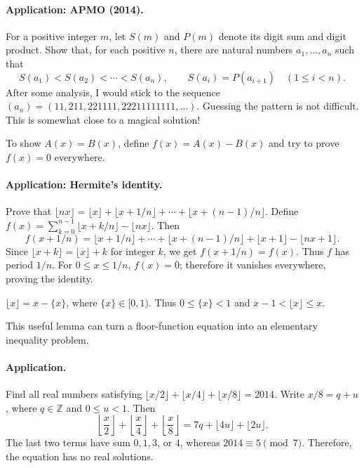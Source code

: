 \documentclass[11pt,a4paper]{article}
\begin{document}
\paragraph{Application: APMO (2014).}
For a positive integer $m$, let $S(m)$ and $P(m)$ denote its digit sum and digit product.
Show that, for each positive $n$, there are natural numbers $a_1,\ldots,a_n$ such that
\[
S(a_1)<S(a_2)<\cdots<S(a_n),\qquad S(a_i)=P(a_{i+1})\quad(1\leq i<n).
\]
After some analysis, I would stick to the sequence
$(a_n)=(11,\allowbreak211,\allowbreak221111,\allowbreak22211111111,\allowbreak\ldots)$.
Guessing the pattern is not difficult. This is somewhat close to a magical solution!

\setcounter{theorem}{55}\begin{lemma}
To show $A(x)=B(x)$, define $f(x)=A(x)-B(x)$ and try to prove $f(x)=0$ everywhere.
\end{lemma}
\paragraph{Application: Hermite's identity.}
Prove that
$\lfloor nx\rfloor=\lfloor x\rfloor+\lfloor x+1/n\rfloor+\cdots+\lfloor x+(n-1)/n\rfloor$.
Define $f(x)=\sum_{k=0}^{n-1}\lfloor x+k/n\rfloor-\lfloor nx\rfloor$.
Then
\[
f(x+1/n)=\lfloor x+1/n\rfloor+\cdots+\lfloor x+(n-1)/n\rfloor
+\lfloor x+1\rfloor-\lfloor nx+1\rfloor.
\]
Since $\lfloor x+k\rfloor=\lfloor x\rfloor+k$ for integer $k$, we get $f(x+1/n)=f(x)$.
Thus $f$ has period $1/n$. For $0\leq x\leq1/n$, $f(x)=0$; therefore it vanishes everywhere, proving the identity.

\setcounter{theorem}{63}\begin{lemma}
$\lfloor x\rfloor=x-\{x\}$, where $\{x\}\in[0,1)$.
Thus $0\leq\{x\}<1$ and $x-1<\lfloor x\rfloor\leq x$.
\end{lemma}
This useful lemma can turn a floor-function equation into an elementary inequality problem.
\paragraph{Application.}
Find all real numbers satisfying
$\lfloor x/2\rfloor+\lfloor x/4\rfloor+\lfloor x/8\rfloor=2014$.
Write $x/8=q+u$, where $q\in\mathbb Z$ and $0\leq u<1$. Then
\[
\left\lfloor\frac x2\right\rfloor+
\left\lfloor\frac x4\right\rfloor+
\left\lfloor\frac x8\right\rfloor
=7q+\lfloor4u\rfloor+\lfloor2u\rfloor.
\]
The last two terms have sum $0,1,3$, or $4$, whereas $2014\equiv5\pmod7$.
Therefore, the equation has no real solutions.
\end{document}
